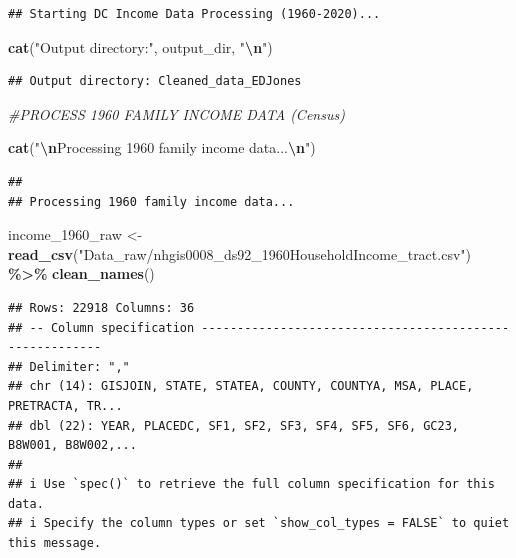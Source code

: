 \documentclass[
]{article}
\newenvironment{Shaded}{\begin{snugshade}}{\end{snugshade}}
\newcommand{\CommentTok}[1]{\textcolor[rgb]{0.56,0.35,0.01}{\textit{#1}}}
\newcommand{\FunctionTok}[1]{\textcolor[rgb]{0.13,0.29,0.53}{\textbf{#1}}}
\newcommand{\NormalTok}[1]{#1}
\newcommand{\OtherTok}[1]{\textcolor[rgb]{0.56,0.35,0.01}{#1}}
\newcommand{\SpecialCharTok}[1]{\textcolor[rgb]{0.81,0.36,0.00}{\textbf{#1}}}
\newcommand{\StringTok}[1]{\textcolor[rgb]{0.31,0.60,0.02}{#1}}
\begin{document}
\begin{verbatim}
## Starting DC Income Data Processing (1960-2020)...
\end{verbatim}

\begin{Shaded}
\begin{Highlighting}[]
\FunctionTok{cat}\NormalTok{(}\StringTok{"Output directory:"}\NormalTok{, output\_dir, }\StringTok{"}\SpecialCharTok{\textbackslash{}n}\StringTok{"}\NormalTok{)}
\end{Highlighting}
\end{Shaded}

\begin{verbatim}
## Output directory: Cleaned_data_EDJones
\end{verbatim}

\begin{Shaded}
\begin{Highlighting}[]
\CommentTok{\#PROCESS 1960 FAMILY INCOME DATA (Census)}

\FunctionTok{cat}\NormalTok{(}\StringTok{"}\SpecialCharTok{\textbackslash{}n}\StringTok{Processing 1960 family income data...}\SpecialCharTok{\textbackslash{}n}\StringTok{"}\NormalTok{)}
\end{Highlighting}
\end{Shaded}

\begin{verbatim}
## 
## Processing 1960 family income data...
\end{verbatim}

\begin{Shaded}
\begin{Highlighting}[]
\NormalTok{income\_1960\_raw }\OtherTok{\textless{}{-}} \FunctionTok{read\_csv}\NormalTok{(}\StringTok{"Data\_raw/nhgis0008\_ds92\_1960HouseholdIncome\_tract.csv"}\NormalTok{) }\SpecialCharTok{\%\textgreater{}\%}
  \FunctionTok{clean\_names}\NormalTok{()}
\end{Highlighting}
\end{Shaded}

\begin{verbatim}
## Rows: 22918 Columns: 36
## -- Column specification --------------------------------------------------------
## Delimiter: ","
## chr (14): GISJOIN, STATE, STATEA, COUNTY, COUNTYA, MSA, PLACE, PRETRACTA, TR...
## dbl (22): YEAR, PLACEDC, SF1, SF2, SF3, SF4, SF5, SF6, GC23, B8W001, B8W002,...
## 
## i Use `spec()` to retrieve the full column specification for this data.
## i Specify the column types or set `show_col_types = FALSE` to quiet this message.
\end{verbatim}
\end{document}
